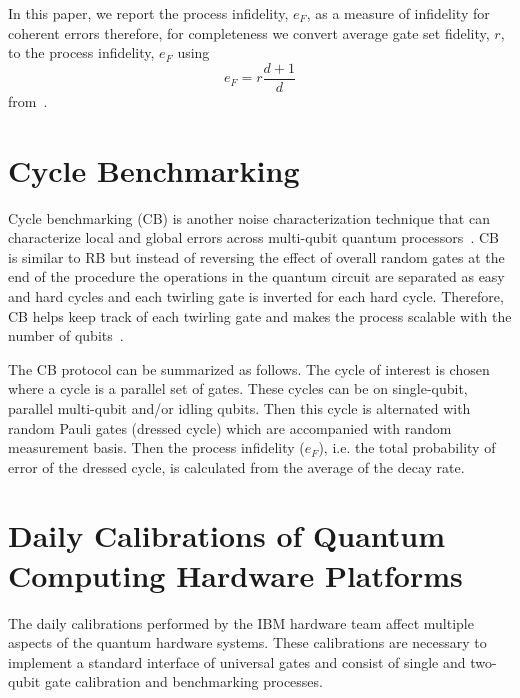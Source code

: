 \begin{appendix}
In this paper, we report the process infidelity, $e_F$, as a measure of infidelity for coherent errors therefore, for completeness we convert average gate set fidelity, $r$, to the process infidelity, $e_F$ using
\begin{equation}
    e_F=r \frac{d+1}{d}
    \label{eq:error_to_proc_infid}
\end{equation} 
from~\cite{NIELSEN2002249}.

\section{Cycle Benchmarking}
\label{sec:cyclebenchmarking}
Cycle benchmarking (CB) is another noise characterization technique that can characterize local and global errors across multi-qubit quantum processors~\cite{Erhard2019}. CB is similar to RB but instead of reversing the effect of overall random gates at the end of the procedure the operations in the quantum circuit are separated as easy and hard cycles and each twirling gate is inverted for each hard cycle. Therefore, CB helps keep track of each twirling gate and makes the process scalable with the number of qubits~\cite{ville2021leveraging}.   

The CB protocol can be summarized as follows. The cycle of interest is chosen where a cycle is a parallel set of gates. These cycles can be on single-qubit, parallel multi-qubit and/or idling qubits. Then this cycle is alternated with random Pauli gates (dressed cycle) which are accompanied with random measurement basis. Then the process infidelity ($e_F$), i.e. the total probability of error of the dressed cycle, is calculated from the average of the decay rate.    





\section{Daily Calibrations of Quantum Computing Hardware Platforms}

The daily calibrations performed by the IBM hardware team affect multiple aspects of the quantum hardware systems. These calibrations are necessary to implement a standard interface of universal gates and consist of single and two-qubit gate calibration and benchmarking processes. 


\end{appendix}
